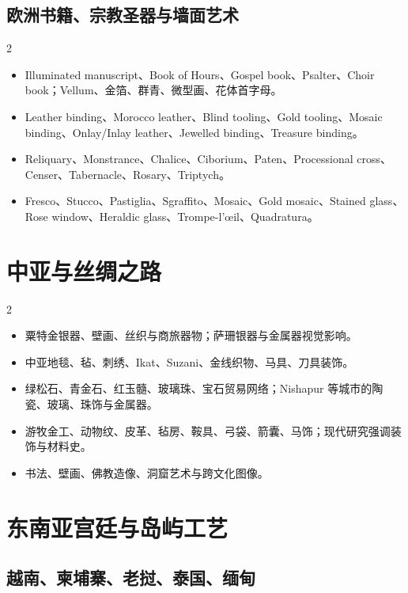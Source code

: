 \documentclass[lang=en,a4paper,11pt]{elegantpaper}
\begin{document}
\subsection{欧洲书籍、宗教圣器与墙面艺术}


\begin{multicols}{2}
\begin{itemize}
\item Illuminated manuscript、Book of Hours、Gospel book、Psalter、Choir book；Vellum、金箔、群青、微型画、花体首字母。
\item Leather binding、Morocco leather、Blind tooling、Gold tooling、Mosaic binding、Onlay/Inlay leather、Jewelled binding、Treasure binding。
\item Reliquary、Monstrance、Chalice、Ciborium、Paten、Processional cross、Censer、Tabernacle、Rosary、Triptych。
\item Fresco、Stucco、Pastiglia、Sgraffito、Mosaic、Gold mosaic、Stained glass、Rose window、Heraldic glass、Trompe-l'œil、Quadratura。
\end{itemize}
\end{multicols}

\section{中亚与丝绸之路}


\begin{multicols}{2}
\begin{itemize}
\item 粟特金银器、壁画、丝织与商旅器物；萨珊银器与金属器视觉影响。
\item 中亚地毯、毡、刺绣、Ikat、Suzani、金线织物、马具、刀具装饰。
\item 绿松石、青金石、红玉髓、玻璃珠、宝石贸易网络；Nishapur 等城市的陶瓷、玻璃、珠饰与金属器。
\item 游牧金工、动物纹、皮革、毡房、鞍具、弓袋、箭囊、马饰；现代研究强调装饰与材料史。
\item 书法、壁画、佛教造像、洞窟艺术与跨文化图像。
\end{itemize}
\end{multicols}

\section{东南亚宫廷与岛屿工艺}


\subsection{越南、柬埔寨、老挝、泰国、缅甸}
\end{document}
